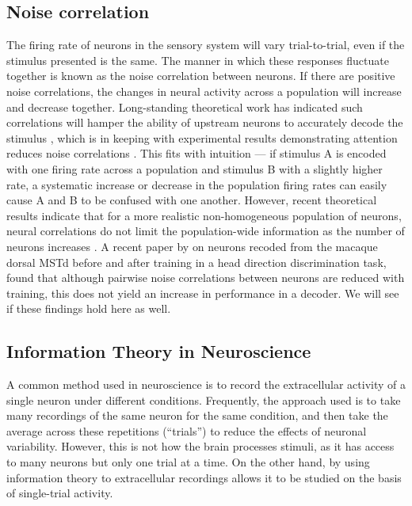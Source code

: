 \subsection{Noise correlation}

The firing rate of neurons in the sensory system will vary trial-to-trial, even if the stimulus presented is the same.
The manner in which these responses fluctuate together is known as the noise correlation between neurons.
If there are positive noise correlations, the changes in neural activity across a population will increase and decrease together.
Long-standing theoretical work has indicated such correlations will hamper the ability of upstream neurons to accurately decode the stimulus%
, which is in keeping with experimental results demonstrating attention reduces noise correlations \citep{Cohen2009}.
This fits with intuition --- if stimulus A is encoded with one firing rate across a population and stimulus B with a slightly higher rate, a systematic increase or decrease in the population firing rates can easily cause A and B to be confused with one another.
However, recent theoretical results indicate that for a more realistic non-homogeneous population of neurons, neural correlations do not limit the population-wide information as the number of neurons increases \citep{Oram1998,Averbeck2006,Ecker2011}.
A recent paper by \citet{Gu2011} on neurons recoded from the macaque dorsal \ac{MSTd} before and after training in a head direction discrimination task, found that although pairwise noise correlations between neurons are reduced with training, this does not yield an increase in performance in a decoder.
We will see if these findings hold here as well.

\subsection{Information Theory in Neuroscience}
\label{sec:bgit}

A common method used in neuroscience is to record the extracellular activity of a single neuron under different conditions.
Frequently, the approach used is to take many recordings of the same neuron for the same condition, and then take the average across these repetitions (``trials'') to reduce the effects of neuronal variability.
However, this is not how the brain processes stimuli, as it has access to many neurons but only one trial at a time.
On the other hand, by using information theory to extracellular recordings allows it to be studied on the basis of single-trial activity.

